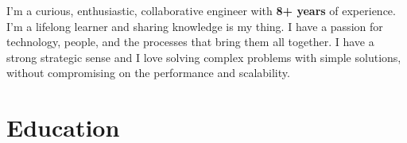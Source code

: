\documentclass[10pt]{friggeri-cv} %
\begin{document}
I'm a curious, enthusiastic, collaborative engineer with \textbf{8+ years} of experience. I'm a lifelong learner and sharing knowledge is my thing. I have a passion for technology, people, and the processes that bring them all together. I have a strong strategic sense and I love solving complex problems with simple solutions, without compromising on the performance and scalability.


\section{Education}

\end{document}
